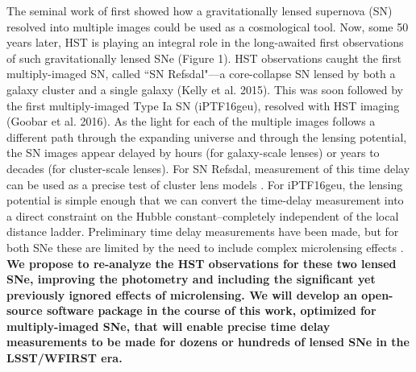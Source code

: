 \forceindent The seminal work of \citet{Refsdal:1964} first showed how a
gravitationally lensed supernova (SN) resolved into multiple images
could be used as a cosmological tool.  Now, some 50 years later, HST
is playing an integral role in the long-awaited first observations of
such gravitationally lensed SNe (Figure 1).  HST observations caught
the first multiply-imaged SN, called ``SN Refsdal"---a core-collapse SN
lensed by both a galaxy cluster and a single galaxy (Kelly et
al. 2015). This was soon followed by the first multiply-imaged Type Ia
SN (iPTF16geu), resolved with HST imaging (Goobar et al. 2016).  As
the light for each of the multiple images follows a different path
through the expanding universe and through the lensing potential, the
SN images appear delayed by hours (for galaxy-scale lenses) or years
to decades (for cluster-scale lenses).  For SN Refsdal, measurement of
this time delay can be used as a precise test of cluster lens models
\citep{Treu:2015b}. For iPTF16geu, the lensing potential is simple
enough that we can convert the time-delay measurement into a direct
constraint on the Hubble constant--completely independent of the local
distance ladder. Preliminary time delay measurements have been made,
but for both SNe these are limited by the need to include complex
microlensing effects \citep{Rodney:2016,More:2016}.  {\bf We propose
to re-analyze the HST observations for these two lensed SNe, improving
the photometry and including the significant yet previously ignored
effects of microlensing.  We will develop an open-source software
package in the course of this work, optimized for multiply-imaged SNe,
that will enable precise time delay measurements to be made for dozens
or hundreds of lensed SNe in the LSST/WFIRST era.}

